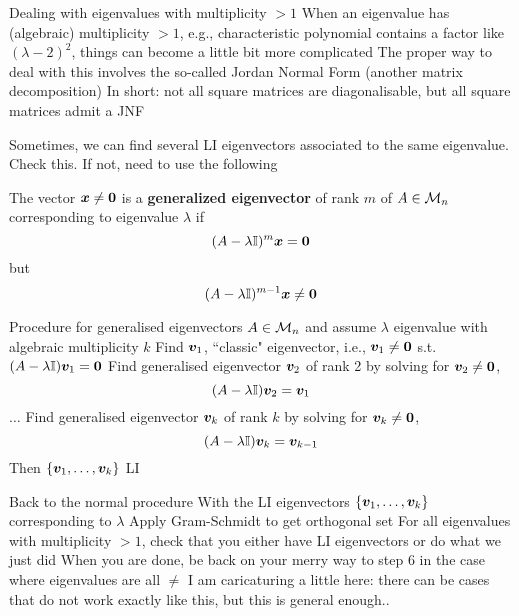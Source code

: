 \documentclass[aspectratio=169]{beamer}\usepackage[]{graphicx}\usepackage[]{xcolor}
\begin{document}
\begin{frame}{Dealing with eigenvalues with multiplicity $>1$}
When an eigenvalue has (algebraic) multiplicity $>1$, e.g., characteristic polynomial contains a factor like $(\lambda-2)^2$, things can become a little bit more complicated
\vfill
The proper way to deal with this involves the so-called Jordan Normal Form (another matrix decomposition)
\vfill
In short: not all square matrices are diagonalisable, but all square matrices admit a JNF
\end{frame}


\begin{frame}
Sometimes, we can find several LI eigenvectors associated to the same eigenvalue. Check this. If not, need to use the following
\vfill
\begin{definition}
The vector $\bx\neq\b0$ is a \textbf{generalized eigenvector} of rank $m$ of $A\in\mathcal{M}_n$ corresponding to eigenvalue $\lambda$ if
\[
(A-\lambda\II)^{m}\bx = \b0
\]
but
\[
(A-\lambda\II)^{m-1}\bx\neq \b0
\]
\end{definition}
\end{frame}


\begin{frame}{Procedure for generalised eigenvectors}
$A\in\mathcal{M}_n$ and assume $\lambda$ eigenvalue with algebraic multiplicity $k$
\vfill
Find $\bm{v}_1$, ``classic" eigenvector, i.e., $\bv_1\neq\b0$ s.t. $(A-\lambda\II)\bv_1=\b0$
\vfill
Find generalised eigenvector $\bm{v}_2$ of rank 2 by solving for $\bv_2\neq\b0$,
\[
(A-\lambda\mathbb{I})\bm{v}_2 = \bm{v}_1
\]
$\ldots$
\vfill
Find generalised eigenvector $\bm{v}_k$ of rank $k$ by solving for $\bv_k\neq\b0$,
\[
(A-\lambda\mathbb{I})\bm{v}_k = \bm{v}_{k-1}
\]
\vfill
Then $\{\bm{v}_1,\ldots,\bm{v}_k\}$ LI
\end{frame}


\begin{frame}{Back to the normal procedure}
With the LI eigenvectors $\{\bm{v}_1,\ldots,\bm{v}_k\}$ corresponding to $\lambda$
\vfill
Apply Gram-Schmidt to get orthogonal set
\vfill
For all eigenvalues with multiplicity $>1$, check that you either have LI eigenvectors or do what we just did
\vfill
When you are done, be back on your merry way to step 6 in the case where eigenvalues are all $\neq$
\vfill
I am caricaturing a little here: there can be cases that do not work exactly like this, but this is general enough..
\end{frame}


\end{document}
